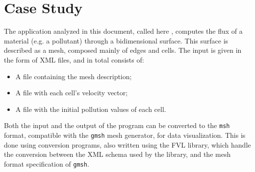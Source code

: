 \section{Case Study}

The application analyzed in this document, called here \polu, computes the flux of a material (e.g. a pollutant) through a bidimensional surface. This surface is described as a mesh, composed mainly of edges and cells. The input is given in the form of XML files, and in total consists of:

\begin{itemize}
	\item A file containing the mesh description;
	\item A file with each cell's velocity vector;
	\item A file with the initial pollution values of each cell.
\end{itemize}

Both the input and the output of the program can be converted to the \texttt{msh} format, compatible with the \texttt{gmsh} mesh generator, for data visualization. This is done using conversion programs, also written using the FVL library, which handle the conversion between the XML schema used by the library, and the mesh format specification of \texttt{gmsh}.



